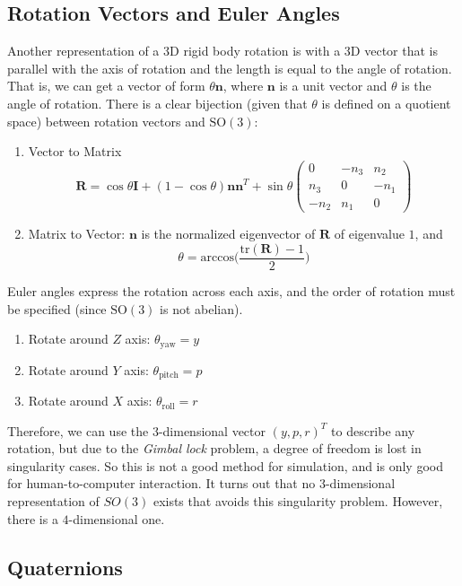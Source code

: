 \documentclass{article}
\theoremstyle{definition}
\theoremstyle{remark}
\theoremstyle{definition}
\begin{document}
\subsection{Rotation Vectors and Euler Angles}
Another representation of a 3D rigid body rotation is with a 3D vector that is parallel with the axis of rotation and the length is equal to the angle of rotation. That is, we can get a vector of form $\theta \mathbf{n}$, where $\mathbf{n}$ is a unit vector and $\theta$ is the angle of rotation. There is a clear bijection (given that $\theta$ is defined on a quotient space) between rotation vectors and $\mathrm{SO}(3)$: 
\begin{enumerate}
    \item Vector to Matrix
    \[\mathbf{R} = \cos{\theta} \mathbf{I} + (1 - \cos{\theta}) \mathbf{n} \mathbf{n}^T + \sin{\theta} \begin{pmatrix} 0 & -n_3 & n_2 \\ n_3 & 0 & -n_1 \\ -n_2 & n_1 & 0 \end{pmatrix} \]
    \item Matrix to Vector: $\mathbf{n}$ is the normalized eigenvector of $\mathbf{R}$ of eigenvalue $1$, and 
    \[\theta = \mathrm{arccos}\bigg( \frac{\mathrm{tr}(\mathbf{R}) - 1}{2} \bigg)\]
\end{enumerate}

Euler angles express the rotation across each axis, and the order of rotation must be specified (since $\mathrm{SO}(3)$ is not abelian).  
\begin{enumerate}
    \item Rotate around $Z$ axis: $\theta_{\mathrm{yaw}} = y$ 
    \item Rotate around $Y$ axis: $\theta_{\mathrm{pitch}} = p$ 
    \item Rotate around $X$ axis: $\theta_{\mathrm{roll}} = r$
\end{enumerate}
Therefore, we can use the 3-dimensional vector $(y, p, r)^T$ to describe any rotation, but due to the \textit{Gimbal lock} problem, a degree of freedom is lost in singularity cases. So this is not a good method for simulation, and is only good for human-to-computer interaction. It turns out that no $3$-dimensional representation of $SO(3)$ exists that avoids this singularity problem. However, there is a $4$-dimensional one. 

\subsection{Quaternions}
\end{document}
